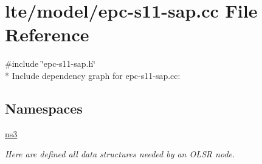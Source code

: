 \hypertarget{epc-s11-sap_8cc}{}\section{lte/model/epc-\/s11-\/sap.cc File Reference}
\label{epc-s11-sap_8cc}
{\ttfamily \#include \char`\"{}epc-\/s11-\/sap.\+h\char`\"{}}\\*
Include dependency graph for epc-\/s11-\/sap.cc\+:
\subsection*{Namespaces}
\begin{DoxyCompactItemize}
\item 
 \hyperlink{namespacens3}{ns3}
\begin{DoxyCompactList}\small\item\em Here are defined all data structures needed by an O\+L\+SR node. \end{DoxyCompactList}\end{DoxyCompactItemize}
